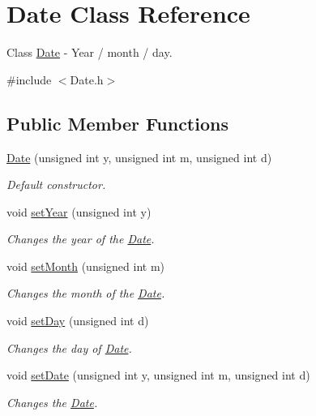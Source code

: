 \hypertarget{class_date}{}\section{Date Class Reference}
\label{class_date}


Class \hyperlink{class_date}{Date} -\/ Year / month / day.  




{\ttfamily \#include $<$Date.\+h$>$}

\subsection*{Public Member Functions}
\begin{DoxyCompactItemize}
\item 
\hyperlink{class_date_a818cdeae426d62baca78fb24a3041395}{Date} (unsigned int y, unsigned int m, unsigned int d)
\begin{DoxyCompactList}\small\item\em Default constructor. \end{DoxyCompactList}\item 
void \hyperlink{class_date_a12214ddd7d5aa3d614d8a068b9701bc4}{set\+Year} (unsigned int y)
\begin{DoxyCompactList}\small\item\em Changes the year of the \hyperlink{class_date}{Date}. \end{DoxyCompactList}\item 
void \hyperlink{class_date_ab2c14958d6ac7b88f37e741e82e456db}{set\+Month} (unsigned int m)
\begin{DoxyCompactList}\small\item\em Changes the month of the \hyperlink{class_date}{Date}. \end{DoxyCompactList}\item 
void \hyperlink{class_date_ad0d7be5956f115287e09fd31d4f91fad}{set\+Day} (unsigned int d)
\begin{DoxyCompactList}\small\item\em Changes the day of \hyperlink{class_date}{Date}. \end{DoxyCompactList}\item 
void \hyperlink{class_date_a81c1ecac7b2fe04d586097866481e830}{set\+Date} (unsigned int y, unsigned int m, unsigned int d)
\begin{DoxyCompactList}\small\item\em Changes the \hyperlink{class_date}{Date}. \end{DoxyCompactList}\item 

\end{DoxyCompactItemize}
